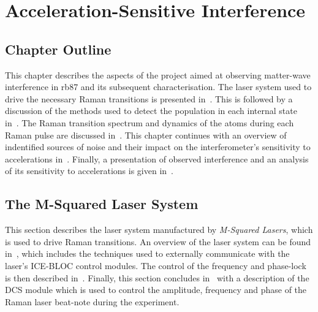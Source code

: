 \chapter{Acceleration-Sensitive Interference}\label{chap:atom_int}

\section{Chapter Outline}
This chapter describes the aspects of the project aimed at observing
matter-wave interference in \ac{rb87} and its subsequent
characterisation. The laser system used to drive the necessary Raman
transitions is presented in~. This is
followed by a discussion of the methods used to detect the population
in each internal state in~. The Raman
transition spectrum and
dynamics of the atoms during each Raman pulse are discussed
in~. This chapter continues
with an overview of indentified sources of noise and their impact on
the interferometer's sensitivity to accelerations
in~. Finally, a presentation of observed
interference and an analysis of its sensitivity to accelerations is
given in~.
\section{The M-Squared Laser System}\label{sec:msquared_laser} 
  This section describes the laser system manufactured by \textit{M-Squared
  Lasers}, which is used to drive Raman transitions. An overview of the laser
  system can be found in~, which includes
  the techniques used to externally communicate with the laser's ICE-BLOC
  control modules. The control of the frequency and phase-lock is then described
  in~. Finally, this section concludes
  in~ with a description of the DCS
  module which is used to control
  the amplitude, frequency and phase of the Raman laser beat-note
  during the experiment.
